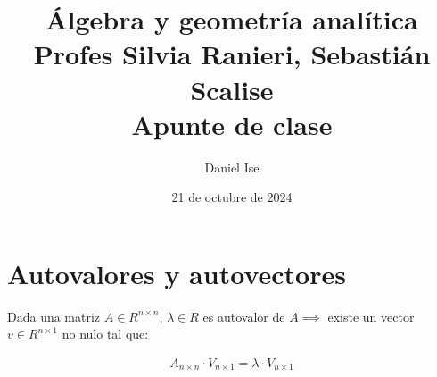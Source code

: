 \documentclass[12pt]{article}
\title{Álgebra y geometría analítica\\
Profes Silvia Ranieri, Sebastián Scalise\\
Apunte de clase}
\author{Daniel Ise}
\date{21 de octubre de 2024}
\begin{document}
\maketitle

\tableofcontents

\section{Autovalores y autovectores}

Dada una matriz \(A \in R^{n \times n}\),
\(\lambda \in R\) es autovalor de \(A \implies\) 
existe un vector \(v \in R^{n\times1}\) no nulo tal que:

\begin{align*}
    A_{n\times n}\cdot V_{n\times1} = \lambda\cdot V_{n \times 1}
\end{align*}
\end{document}
